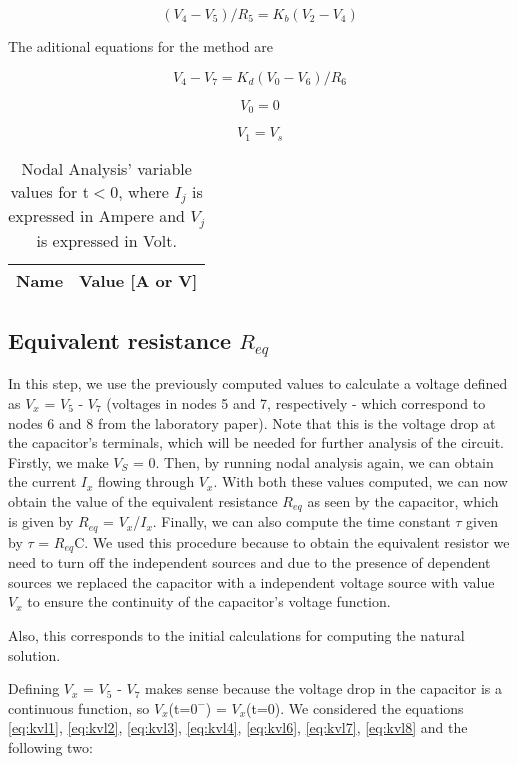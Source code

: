 \begin{equation}
  (V_4 - V_5)/R_5 = K_b(V_2 - V_4)
  \label{eq:kvl5}
\end{equation}

The aditional equations for the method are

\begin{equation}
  V_4 - V_7 = K_d(V_0 - V_6)/R_6
  \label{eq:kvl6}
\end{equation}

\begin{equation}
  V_0 = 0
  \label{eq:kvl7}
\end{equation}

\begin{equation}
  V_1 = V_s
  \label{eq:kvl8}
\end{equation}


\begin{table}[h]
  \centering
  \begin{tabular}{|l|r|}
    \hline    
    {\bf Name} & {\bf Value [A or V]} \\ \hline
    
  \end{tabular}
  \caption{Nodal Analysis' variable values for t$<$0, where $I_j$ is expressed in Ampere and $V_j$ is expressed in Volt.}
  \label{tab:Nodal}
\end{table}
\FloatBarrier

\subsection{Equivalent resistance $R_{eq}$}
\label{sec:2.2}

In this step, we use the previously computed values to calculate a voltage defined as $V_x$ = $V_5$ - $V_7$ (voltages in nodes 5 and 7, respectively - which correspond to nodes 6 and 8 from the laboratory paper). Note that this is the voltage drop at the capacitor's terminals, which will be needed for further analysis of the circuit. Firstly, we make $V_S$ = 0. Then, by running nodal analysis again, we can obtain the current $I_x$ flowing through $V_x$. With both these values computed, we can now obtain the value of the equivalent resistance $R_{eq}$ as seen by the capacitor, which is given by $R_{eq}$ = $V_x$/$I_x$. Finally, we can also compute the time constant $\tau$ given by $\tau$ = $R_{eq}$C. We used this procedure because to obtain the equivalent resistor we need to turn off the independent sources and due to the presence of dependent sources we replaced the capacitor with a independent voltage source with value $V_x$ to ensure the continuity of the capacitor's voltage function. \par   
Also, this corresponds to the initial calculations for computing the natural solution. \par
Defining $V_x$ = $V_5$ - $V_7$ makes sense because the voltage drop in the capacitor is a continuous function, so $V_x$(t=$0^-$) = $V_x$(t=0).
We considered the equations \ref{eq:kvl1}, \ref{eq:kvl2}, \ref{eq:kvl3}, \ref{eq:kvl4}, \ref{eq:kvl6}, \ref{eq:kvl7}, \ref{eq:kvl8} and the following two:

